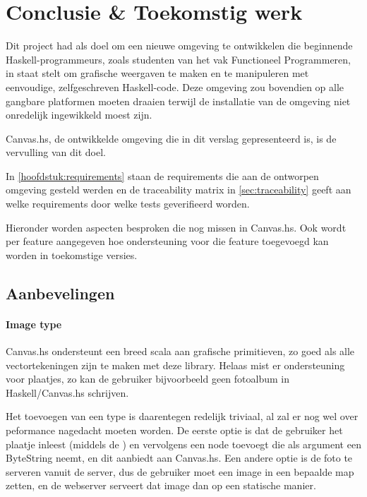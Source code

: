 \chapter{Conclusie \& Toekomstig werk} \label{hoofdstuk:conclusie}
Dit project had als doel om een nieuwe omgeving te ontwikkelen die beginnende Haskell-programmeurs, zoals studenten van het vak Functioneel Programmeren, in staat stelt om grafische weergaven te maken en te manipuleren met eenvoudige, zelfgeschreven Haskell-code. Deze omgeving zou bovendien op alle gangbare platformen moeten draaien terwijl de installatie van de omgeving niet onredelijk ingewikkeld moest zijn.

Canvas.hs, de ontwikkelde omgeving die in dit verslag gepresenteerd is, is de vervulling van dit doel. 

In \autoref{hoofdstuk:requirements} staan de requirements die aan de ontworpen omgeving gesteld werden en de traceability matrix in \autoref{sec:traceability} geeft aan welke requirements door welke tests geverifieerd worden.


Hieronder worden aspecten besproken die nog missen in Canvas.hs. Ook wordt per feature aangegeven hoe ondersteuning voor die feature toegevoegd kan worden in toekomstige versies.

\section{Aanbevelingen}

\subsubsection{Image type}
Canvas.hs ondersteunt een breed scala aan grafische primitieven, zo goed als alle vectortekeningen zijn te maken met deze library. Helaas mist er ondersteuning voor plaatjes, zo kan de gebruiker bijvoorbeeld geen fotoalbum in Haskell/Canvas.hs schrijven.

Het toevoegen van een  type is daarentegen redelijk triviaal, al zal er nog wel over peformance nagedacht moeten worden. De eerste optie is dat de gebruiker het plaatje inleest (middels de ) en vervolgens een  node toevoegt die als argument een ByteString neemt, en dit aanbiedt aan Canvas.hs. Een andere optie is de foto te serveren vanuit de server, dus de gebruiker moet een image in een bepaalde map zetten, en de webserver serveert dat image dan op een statische manier.

